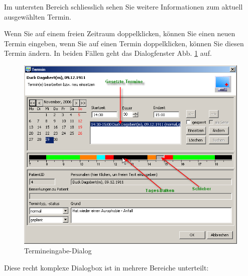 Im untersten Bereich schliesslich sehen Sie weitere Informationen zum aktuell ausgewählten Termin.

\bigskip

Wenn Sie auf einem freien Zeitraum doppelklicken, können Sie einen neuen Termin eingeben, wenn Sie auf einen Termin doppelklicken,
können Sie diesen Termin ändern. In beiden Fällen geht das Dialogfenster Abb. \ref{fig:termineingabe} auf.

\begin{figure}[ht]
\includegraphics[width=5in]{images/use4.png}
\caption{Termineingabe-Dialog}\label{fig:termineingabe}
\end{figure}
Diese recht komplexe Dialogbox ist in mehrere Bereiche unterteilt:

